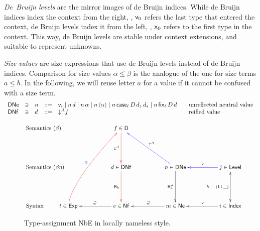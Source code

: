 \documentclass[acmlarge,review,anonymous]{acmart}\settopmatter{printfolios=true}
\begin{document}
\emph{De~Bruijn levels} are the mirror images of de Bruijn indices.  While de Bruijn
indices index the context from the right, \ie, $\mathsf{v}_{0}$ refers the
last type that entered the context, de Bruijn levels index it from the
left, \ie, $\mathsf{x}_{0}$ refers to the first type in the context.  This
way, de Bruijn levels are stable under context extensions, and
suitable to represent unknowns.

\emph{Size values} \fbox{$\alpha, \beta \in \SIZE$} are size
expressions that use de Bruijn levels instead of de Bruijn
indices. Comparison for size values $\alpha \leq \beta$ is the
analogue of the one for size terms $a \leq b$.  In the following, we
will reuse letter $a$ for a value if it cannot be confused with a size
term.
\[
\begin{array}{lllll@{\qquad}l}
  \DNe & \ni &
  n & ::= & \ind i \mid n\,d \mid n\,\alpha \mid n\,\ann \alpha \mid
            n\,\case[\ell] D{d_z}{d_s} \mid n\,\fix[\ell] D d
    & \mbox{unreflected neutral value} \\
  \DNf & \ni &
  d & ::= & \down A f
    & \mbox{reified value} \\
\end{array}
\]

\begin{figure}
$$
\xymatrix@R=12ex@C=12ex{
\mathrlap{\mbox{Semantics ($\beta$)}} &
  &                f \in \D   \ar@[red][d]_{\down A}
\\
\mathrlap{\mbox{Semantics ($\beta\eta$)}} &
  &                d \in \DNf \ar@[red][d]_{\tR_k{}}
  &                n \in \DNe \ar[d]_{\tRne_k} \ar@[blue][ul]_{\up A}
  & \ar@[blue][l]_{\var{}} j \in \Level \ar@{<->}[d]_{k\dotminus(1+\_)}
\\
\mathrlap{\mbox{Syntax}} &
t \in \Exp \ar@[red]@(u,dl)[uur]^{\_\color{blue}\eta} %
  & \ar[l]_{\supseteq}  v \in \Nf
  & \ar[l]_{\supseteq}  m \in \Ne
  & \ar[l]_{\ind{}}     i \in \Index
  &
}
$$
\caption{Type-assignment NbE in locally nameless
    style.\label{fig:typedchart}}
\end{figure}
\end{document}
